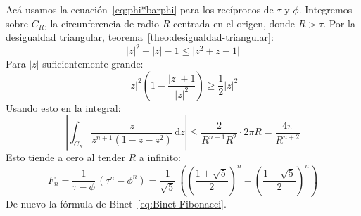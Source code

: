  Acá usamos la ecuación~\eqref{eq:phi*barphi} para los recíprocos
  de \(\tau\) y \(\phi\).
  Integremos sobre \(C_R\),
  la circunferencia de radio \(R\) centrada en el origen,
  donde \(R > \tau\).
  Por la desigualdad triangular,%
  teorema~\ref{theo:desigualdad-triangular}:
  \begin{equation*}
    \lvert z \rvert^2 - \lvert z \rvert - 1
      \le \lvert z^2 + z - 1 \rvert
  \end{equation*}
  Para \(\lvert z \rvert\) suficientemente grande:
  \begin{equation*}
    \lvert z \rvert^2
       \left(
	 1 - \frac{\lvert z \rvert + 1}{\lvert z \rvert^2}
       \right)
       \ge \frac{1}{2} \lvert z \rvert^2
  \end{equation*}
  Usando esto en la integral:
  \begin{equation*}
    \left\lvert
      \int_{C_R} \frac{z}{z^{n + 1}(1 - z - z^2)} \, \mathrm{d} z
    \right\rvert
      \le \frac{2}{R^{n + 1} R^2}
	    \cdot 2 \pi R
      = \frac{4 \pi}{R^{n + 2}}
  \end{equation*}
  Esto tiende a cero al tender \(R\) a infinito:
  \begin{equation*}
    F_n
      = \frac{1}{\tau - \phi} \,
	  \left(
	    \tau^n - \phi^n
	  \right)
      = \frac{1}{\sqrt{5}} \,
	  \left(
	    \left( \frac{1 + \sqrt{5}}{2} \right)^n
	      - \left( \frac{1 - \sqrt{5}}{2} \right)^n
	  \right)
  \end{equation*}
  De nuevo la fórmula de Binet~\eqref{eq:Binet-Fibonacci}.%



